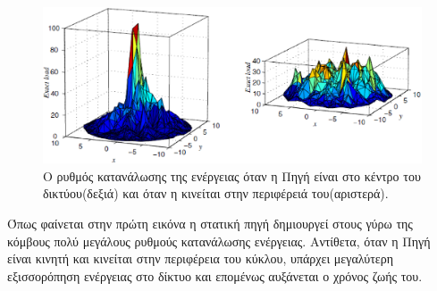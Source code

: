 \begin{figure}[h]
	\centering
	\includegraphics[width=\textwidth]{images/jointmobility_dissipation.eps}
	\caption{Ο ρυθμός κατανάλωσης της ενέργειας όταν η Πηγή είναι στο κέντρο του δικτύου(δεξιά) και όταν η κινείται στην περιφέρειά του(αριστερά).}
	\label{fig:jointmobility_dissipation}
\end{figure}

Όπως φαίνεται στην πρώτη εικόνα η στατική πηγή δημιουργεί στους γύρω της κόμβους πολύ μεγάλους ρυθμούς κατανάλωσης ενέργειας. Αντίθετα, όταν η Πηγή είναι κινητή και
κινείται στην περιφέρεια του κύκλου, υπάρχει μεγαλύτερη εξισσορόπηση ενέργειας στο δίκτυο και επομένως αυξάνεται ο χρόνος ζωής του.

